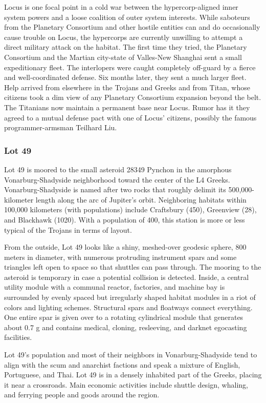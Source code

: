 Locus is one focal point in a cold war between the 
hypercorp-aligned inner system powers and a loose 
coalition of outer system interests. While saboteurs 
from the Planetary Consortium and other hostile 
entities can and do occasionally cause trouble on 
Locus, the hypercorps are currently unwilling to 
attempt a direct military attack on the habitat. The 
first time they tried, the Planetary Consortium and 
the Martian city-state of Valles-New Shanghai sent 
a small expeditionary fleet. The interlopers were 
caught completely off-guard by a fierce and well-coordinated
defense. Six months later, they sent a
much larger fleet. Help arrived from elsewhere in the 
Trojans and Greeks and from Titan, whose citizens 
took a dim view of any Planetary Consortium expansion
beyond the belt. The Titanians now maintain
a permanent base near Locus. Rumor has it they
agreed to a mutual defense pact with one of Locus' 
citizens, possibly the famous programmer-armsman 
Teilhard Liu.

\subsubsection{Lot 49}

Lot 49 is moored to the small asteroid 28349 Pynchon 
in the amorphous Vonarburg-Shadyside neighborhood
toward the center of the L4 Greeks. Vonarburg-Shadyside
is named after two rocks that roughly
delimit its 500,000-kilometer length along the arc of 
Jupiter's orbit. Neighboring habitats within 100,000 
kilometers (with populations) include Craftsbury 
(450), Greenview (28), and Blackhawk (1020). With a 
population of 400, this station is more or less typical 
of the Trojans in terms of layout.

From the outside, Lot 49 looks like a shiny, meshed-over
geodesic sphere, 800 meters in diameter, with
numerous protruding instrument spars and some 
triangles left open to space so that shuttles can pass 
through. The mooring to the asteroid is temporary in 
case a potential collision is detected. Inside, a central 
utility module with a communal reactor, factories, 
and machine bay is surrounded by evenly spaced but 
irregularly shaped habitat modules in a riot of colors 
and lighting schemes. Structural spars and floatways 
connect everything. One entire spar is given over to a 
rotating cylindrical module that generates about 0.7 g 
and contains medical, cloning, resleeving, and darknet 
egocasting facilities.

Lot 49's population and most of their neighbors 
in Vonarburg-Shadyside tend to align with the scum 
and anarchist factions and speak a mixture of English, 
Portuguese, and Thai. Lot 49 is in a densely inhabited 
part of the Greeks, placing it near a crossroads. Main 
economic activities include shuttle design, whaling, 
and ferrying people and goods around the region.

